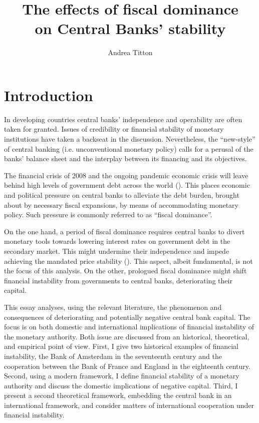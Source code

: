 \documentclass[american]{scrartcl}
\title{The effects of fiscal dominance \\ on Central Banks' stability}
\author{Andrea Titton}
\begin{document}
\clearpage
\thispagestyle{empty}
\maketitle
\clearpage


\iffalse
    History | Theory of CB dividends | Financial stability under deferred assets |
    Expectations of Inflation | Effects on global banks
\fi


\section{Introduction}

In developing countries central banks' independence and operability are often taken for granted. Issues of credibility or financial stability of monetary institutions have taken a backseat in the discussion. Nevertheless, the ``new-style'' of central banking (i.e. unconventional monetary policy) calls for a perusal of the banks' balance sheet and the interplay between its financing and its objectives.

The financial crisis of 2008 and the ongoing pandemic economic crisis will leave behind high levels of government debt across the world (\cite{WEO2020}). This places economic and political pressure on central banks to alleviate the debt burden, brought about by necessary fiscal expansions, by means of accommodating monetary policy. Such pressure is commonly referred to as ``fiscal dominance''.

On the one hand, a period of fiscal dominance requires central banks to divert monetary tools towards lowering interest rates on government debt in the secondary market. This might undermine their independence and impede achieving the mandated price stability (\cite{Schnabel2020}). This aspect, albeit fundamental, is not the focus of this analysis. On the other, prologued fiscal dominance might shift financial instability from governments to central banks, deteriorating their capital.

This essay analyses, using the relevant literature, the phenomenon and consequences of deteriorating and potentially negative central bank capital. The focus is on both domestic and international implications of financial instability of the monetary authority. Both issue are discussed from an historical, theoretical, and empirical point of view. First, I give two historical examples of financial instability, the Bank of Amsterdam in the seventeenth century and the cooperation between the Bank of France and England in the eighteenth century. Second, using a modern framework, I define financial stability of a monetary authority and discuss the domestic implications of negative capital. Third, I present a second theoretical framework, embedding the central bank in an international framework, and consider matters of international cooperation under financial instability.
\end{document}
